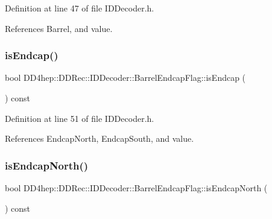 Definition at line 47 of file I\+D\+Decoder.\+h.



References Barrel, and value.

\hypertarget{class_d_d4hep_1_1_d_d_rec_1_1_i_d_decoder_1_1_barrel_endcap_flag_a4030f88c4a1f681cf9a21e5591fa5de3}{}\label{class_d_d4hep_1_1_d_d_rec_1_1_i_d_decoder_1_1_barrel_endcap_flag_a4030f88c4a1f681cf9a21e5591fa5de3} 
\subsubsection{\texorpdfstring{is\+Endcap()}{isEndcap()}}
{\footnotesize\ttfamily bool D\+D4hep\+::\+D\+D\+Rec\+::\+I\+D\+Decoder\+::\+Barrel\+Endcap\+Flag\+::is\+Endcap (\begin{DoxyParamCaption}{ }\end{DoxyParamCaption}) const\hspace{0.3cm}{\ttfamily [inline]}}



Definition at line 51 of file I\+D\+Decoder.\+h.



References Endcap\+North, Endcap\+South, and value.

\hypertarget{class_d_d4hep_1_1_d_d_rec_1_1_i_d_decoder_1_1_barrel_endcap_flag_a83bbd01758f59d4adfdcf3d65af33992}{}\label{class_d_d4hep_1_1_d_d_rec_1_1_i_d_decoder_1_1_barrel_endcap_flag_a83bbd01758f59d4adfdcf3d65af33992} 
\subsubsection{\texorpdfstring{is\+Endcap\+North()}{isEndcapNorth()}}
{\footnotesize\ttfamily bool D\+D4hep\+::\+D\+D\+Rec\+::\+I\+D\+Decoder\+::\+Barrel\+Endcap\+Flag\+::is\+Endcap\+North (\begin{DoxyParamCaption}{ }\end{DoxyParamCaption}) const\hspace{0.3cm}{\ttfamily [inline]}}



